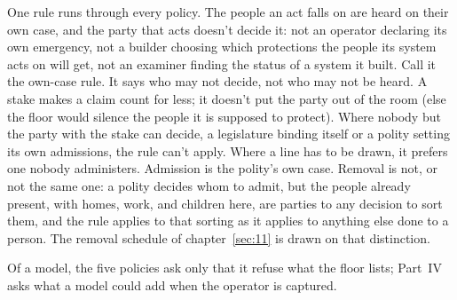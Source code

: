 One rule runs through every policy. The people an act falls on are heard on their own case, and the party that acts doesn't decide it: not an operator declaring its own emergency, not a builder choosing which protections the people its system acts on will get, not an examiner finding the status of a system it built. Call it the own-case rule. It says who may not decide, not who may not be heard. A stake makes a claim count for less; it doesn't put the party out of the room (else the floor would silence the people it is supposed to protect). Where nobody but the party with the stake can decide, a legislature binding itself or a polity setting its own admissions, the rule can't apply. Where a line has to be drawn, it prefers one nobody administers. Admission is the polity's own case. Removal is not, or not the same one: a polity decides whom to admit, but the people already present, with homes, work, and children here, are parties to any decision to sort them, and the rule applies to that sorting as it applies to anything else done to a person. The removal schedule of chapter~\ref{sec:11} is drawn on that distinction.

Of a model, the five policies ask only that it refuse what the floor lists; Part~IV asks what a model could add when the operator is captured.

